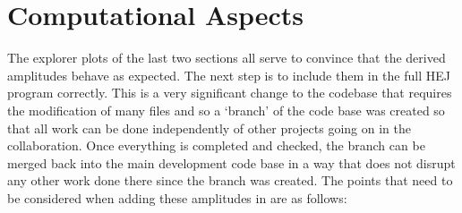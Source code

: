 \section{Computational Aspects}
The explorer plots of the last two sections all serve to convince that the derived amplitudes behave as expected. The next step is to include them in the full HEJ program correctly. This is a very significant change to the codebase that requires the modification of many files and so a `branch' of the code base was created so that all work can be done independently of other projects going on in the collaboration. Once everything is completed and checked, the branch can be merged back into the main development code base in a way that does not disrupt any other work done there since the branch was created. The points that need to be considered when adding these amplitudes in are as follows:

